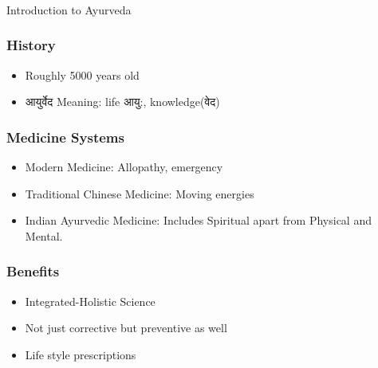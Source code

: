\begin{frame}[fragile]\frametitle{}
\begin{center}
{\Large Introduction to Ayurveda}
\end{center}
\end{frame}

\begin{frame}[fragile]\frametitle{History}
	\begin{itemize}
	\item  Roughly 5000 years old
	\item आयुर्वेद Meaning: life आयु:, knowledge(वेद)
	\end{itemize}

\end{frame}

\begin{frame}[fragile]\frametitle{Medicine Systems}
	\begin{itemize}
	\item Modern Medicine: Allopathy, emergency
	\item  Traditional Chinese Medicine: Moving energies
	\item Indian Ayurvedic Medicine: Includes Spiritual apart from Physical and Mental.
	\end{itemize}

\end{frame}

\begin{frame}[fragile]\frametitle{Benefits}
	\begin{itemize}
	\item Integrated-Holistic Science
	\item Not just corrective but preventive as well
	\item Life style prescriptions
	\end{itemize}

\end{frame}

